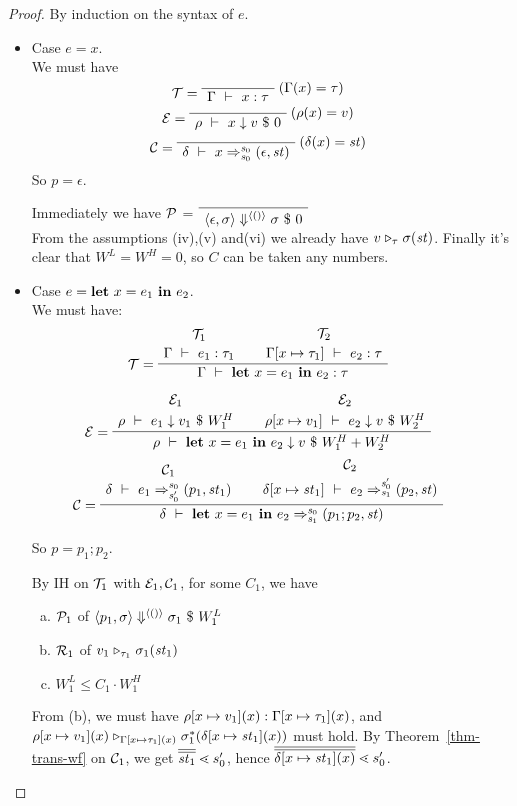\begin{proof}
	
	By induction on the syntax of $e$.
	
	\begin{itemize}
	
\item Case $e = x$.\\
We must have 
$$\MT = \PT{
	\AxiomC{}
	\RiLa{(\Gam(x) = \tau)}
	\UC{\Type{\Gam}{x}{\tau}}
}$$
$$ \ME = 
\PT{
	\AxiomC{}
	\RiLa{(\rho(x)=v)}
	\UC{\Eval{\rho}{x}{v}{0}}
}$$
$$ \MC = 
\PT{\AC{}
	\RiLa{(\del(x)= \st)}
	\UC{\Trans{\del}{x}{\s_0}{\s_0}{\sfun{\epsilon}{\st}}}}
$$
So $p= \epsilon$. 

Immediately we have $\mathcal{P}$ =
$\PT{\Axiom{\seval{\epsilon}{\sgm}{\vunit}{\sgm}{0}}}$\\
From the assumptions (iv),(v) and(vi) we already have $v \mathrel{\triangleright_{\tau}} \sigma(\mathit{st})$.
Finally it's clear that $W^L = W^H = 0$, so $C$ can be taken any numbers. 


\item \label{case-let} Case $e = \mathbf{let} \ x = e_1 \ \mathbf{in} \ e_2$. \\[1ex]
We must have:
$$\PT{
	\UCN{\MT_1}{\Type{\Gam}{e_1}{\tau_1}}
	\UCN{\MT_2}{\Type{\Gam[\Map{x}{\tau_1}]}{e_2}{\tau}}
	\LeLa{\MT =} 
	\BC{\Type{\Gam}{\Let{x}{e_1}{e_2}}{\tau}}
}$$

$$\PT{	
	\UCN{\ME_1}{\Eval{\rho}{e_1}{v_1}{W^H_1}}
	\UCN{\ME_2}{\Eval{\rho[\Map{x}{v_1}]}{e_2}{v}{W^H_2}}
	\LeLa{\ME =} 
	\BC{\Eval{\rho}{\Let{x}{e_1}{e_2}}{v}{W^H_1+W^H_2}}
}$$ 
$$\PT{\UCN{\MC_1}{\Trans{\del}{e_1}{\s_0}{\s_0'}{\sfun{p_1}{\st_1}}}
	\UCN{\MC_2}{\Trans{\del[x \|-> {\st_1}]}{e_2}{\s_0'}{\s_1}{\sfun {p_2} {\st}}}
	\LeLa{\MC = }
	\BC{\Trans{\del}{\Let{x}{e_1}{e_2}}{\s_0}{\s_1}{\sfun {p_1;p_2} {\st}}}
}$$

So $p = p_1;p_2$. 

By IH on $\mathcal{T}_1$ with $\mathcal{E}_1,\mathcal{C}_1$, for some $C_1$, we have
\begin{enumerate}[(a)]
	\item $\mathcal{P}_1$ of $\left\langle p_1,\sigma \right\rangle \Downarrow^{\langle () \rangle} \sigma_1 \ \$ \ W^L_1$
	\item $\mathcal{R}_1$ of $v_1 \mathrel{\triangleright_{\tau_1}} \sigma_1(\mathit{st}_1)$
    \item $W^L_1 \le C_1 \cdot W^H_1 $ 
\end{enumerate}

From (b), we must have $\rho[x \mapsto v_1](x) : \Gamma[x \mapsto \tau_1](x)$, and  $\rho[x \mapsto v_1](x) \mathrel{\triangleright_{\Gamma[x \mapsto \tau_1](x)}} \sigma_1^*(\delta[x \mapsto \mathit{st}_1](x))$ must hold. 
By Theorem~\ref{thm-trans-wf} on $\mathcal{C}_1$, 
we get $\olol{\st_1} \.< s_0'$, hence $\olol{\delta[\Map{x}{\st_1}](x)} \.< s_0'$. 


\end{itemize}
\end{proof}
